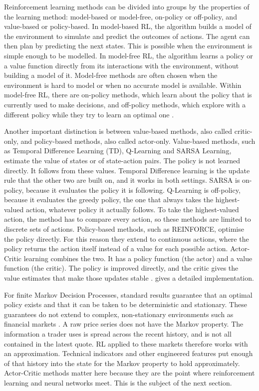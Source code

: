 Reinforcement learning methods can be divided into groups by the properties of the learning method: model-based or model-free, on-policy or off-policy, and value-based or policy-based. In model-based RL, the algorithm builds a model of the environment to simulate and predict the outcomes of actions. The agent can then plan by predicting the next states. This is possible when the environment is simple enough to be modelled. In model-free RL, the algorithm learns a policy or a value function directly from its interactions with the environment, without building a model of it. Model-free methods are often chosen when the environment is hard to model or when no accurate model is available. Within model-free RL, there are on-policy methods, which learn about the policy that is currently used to make decisions, and off-policy methods, which explore with a different policy while they try to learn an optimal one \cite{sutton_reinforcement_2018}.

Another important distinction is between value-based methods, also called critic-only, and policy-based methods, also called actor-only. Value-based methods, such as Temporal Difference Learning (TD), Q-Learning and SARSA Learning, estimate the value of states or of state-action pairs. The policy is not learned directly. It follows from these values. Temporal Difference learning is the update rule that the other two are built on, and it works in both settings. SARSA is on-policy, because it evaluates the policy it is following. Q-Learning is off-policy, because it evaluates the greedy policy, the one that always takes the highest-valued action, whatever policy it actually follows. To take the highest-valued action, the method has to compare every action, so these methods are limited to discrete sets of actions. Policy-based methods, such as REINFORCE, optimise the policy directly. For this reason they extend to continuous actions, where the policy returns the action itself instead of a value for each possible action. Actor-Critic learning combines the two. It has a policy function (the actor) and a value function (the critic). The policy is improved directly, and the critic gives the value estimates that make those updates stable \cite{sutton_reinforcement_2018}.  gives a detailed implementation.



For finite Markov Decision Processes, standard results guarantee that an optimal policy exists and that it can be taken to be deterministic and stationary. These guarantees do not extend to complex, non-stationary environments such as financial markets \cite{sutton_reinforcement_2018}. A raw price series does not have the Markov property. The information a trader uses is spread across the recent history, and is not all contained in the latest quote. RL applied to these markets therefore works with an approximation. Technical indicators and other engineered features put enough of that history into the state for the Markov property to hold approximately. Actor-Critic methods matter here because they are the point where reinforcement learning and neural networks meet. This is the subject of the next section.